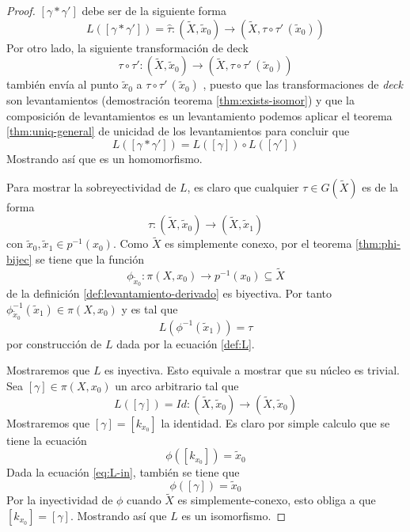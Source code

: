 \begin{proof}
  \([\gamma * \gamma']\) debe ser de la siguiente forma
  \[ L \left( [\gamma * \gamma'] \right) = \hat \tau : (\tilde X, \tilde
    x _0) \to (\tilde X , \tau \circ \tau' \, (\tilde x_0)) \]
  Por otro lado, la siguiente transformación de deck
  \[ \tau \circ \tau' : (\tilde X, \tilde x _0) \to (\tilde X , \tau
    \circ \tau' \, (\tilde x_0))
  \]
  también envía al punto \(\tilde x_0\) a \(\tau \circ \tau' \, (\tilde
  x_0)\) , puesto que las transformaciones de \emph{deck} son
  levantamientos (demostración teorema \ref{thm:exists-isomor}) y que la
  composición de levantamientos es un levantamiento podemos aplicar el
  teorema \ref{thm:uniq-general} de unicidad de los levantamientos para
  concluir que
  \[ L \left( [\gamma * \gamma'] \right) = L \left( [\gamma] \right)
    \circ L \left( [\gamma'] \right)\]
  Mostrando así que es un homomorfismo.

  Para mostrar la sobreyectividad de \(L\), es claro que cualquier
  \(\tau \in G (\tilde X)\) es de la forma
  \[ \tau : (\tilde X, \tilde x_0) \to (\tilde X, \tilde x_1) \]
  con \(\tilde x_0, \tilde x_1 \in p^{-1} (x_0)\). Como \(\tilde X\) es
  simplemente conexo, por el teorema \ref{thm:phi-bijec} se tiene que la
  función
  \[\phi_{\tilde x_0} : \pi (X, x_0) \to p^{-1} (x_0) \subseteq \tilde
    X \]
  de la definición \ref{def:levantamiento-derivado} es
  biyectiva. Por tanto \(\phi_{\tilde x_0}^{-1} (\tilde x_1) \in \pi (X,
  x_0)\) y es tal que
  \[ L \left( \phi^{-1} (\tilde x_1) \right) = \tau \]
  por construcción de \(L\) dada por la ecuación \eqref{def:L}.

  Mostraremos que \(L\) es inyectiva. Esto equivale a mostrar que su
  núcleo es trivial. Sea \([\gamma] \in \pi (X , x_0)\) un arco
  arbitrario tal que
  \begin{equation} \label{eq:L-in}
    L \left( [\gamma] \right) = Id : (\tilde X , \tilde x_0) \to
      (\tilde X, \tilde x_0)
  \end{equation}
  Mostraremos que \([\gamma] = [k_{x_0}]\) la identidad. Es claro por
  simple calculo que se tiene la ecuación
  \[ \phi \left( [k_{x_0}] \right) = \tilde x _0 \]
  Dada la ecuación \eqref{eq:L-in}, también se tiene que
  \[ \phi \left( [\gamma] \right) = \tilde x_0 \]
  Por la inyectividad de \(\phi\) cuando \(\tilde X\) es
  simplemente-conexo, esto obliga a que \([k_{x_0}] = [\gamma]\).
  Mostrando así que \(L\) es un isomorfismo.
\end{proof}

